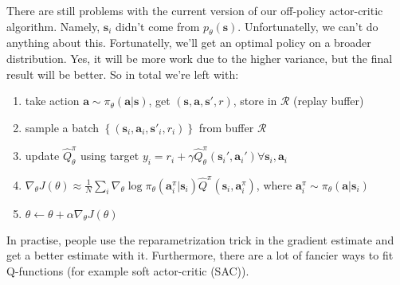 \documentclass{report}
\begin{document}
There are still problems with the current version of our off-policy actor-critic algorithm.
Namely, $\bm{s}_i$ didn't come from $p_\theta(\bm{s})$. Unfortunatelly, we
can't do anything about this.
Fortunatelly, we'll get an optimal policy on a broader distribution. Yes, it will be more work 
due to the higher variance, but the final result will be better.
So in total we're left with:
\begin{enumerate}
		\item take action $\bm{a} \sim \pi_\theta(\bm{a}|\bm{s})$, get $(\bm{s}, \bm{a},\bm{s'},r)$, store in $\mathcal{R}$ (replay buffer)
		\item sample a batch $\left\{  (\bm{s}_i, \bm{a}_i,\bm{s'}_i,r_i) \right\} $ from buffer $\mathcal{R}$
		\item update $\hat{Q}^\pi_\theta$ using target $y_i = r_i + \gamma \hat{Q}^\pi_\theta(\bm{s}_i', \bm{a}_i') \forall \bm{s}_i, \bm{a}_i$
		\item $\nabla_\theta J(\theta) \approx  \frac{1}{N} \sum_{i}^{}  \nabla_{\theta} \log \pi_\theta(\bm{a}^\pi_i|\bm{s}_i)\hat{Q}^\pi(\bm{s}_{i}, \bm{a}^\pi_{i})$,
				where $\bm{a}_i^\pi \sim \pi_\theta(\bm{a} | \bm{s}_i)$
		\item $\theta \leftarrow \theta  + \alpha \nabla_\theta J(\theta)$
\end{enumerate}
In practise, people use the reparametrization trick in the gradient estimate and get a better estimate with it.
Furthermore, there are a lot of fancier ways to fit Q-functions (for example soft actor-critic (SAC)).
\end{document}
